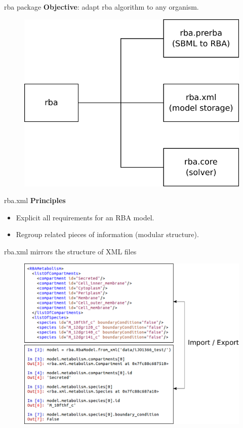 \documentclass{beamer}
\begin{document}
\begin{frame}{rba package}
  \textbf{Objective}: adapt rba algorithm to any organism.
  \begin{figure}[!ht]
    \centering
    \includegraphics[width=0.8\linewidth]{package_structure}
  \end{figure}
\end{frame}

\begin{frame}{rba.xml}
  \textbf{Principles}
  \begin{itemize}
    \item Explicit all requirements for an RBA model.
    \item Regroup related pieces of information (modular structure).
  \end{itemize}
\end{frame}

\begin{frame}[fragile]{rba.xml mirrors the structure of XML files}
  \begin{figure}[!ht]
    \centering
    \includegraphics[width=\linewidth]{xml_python_mirror}
  \end{figure}
\end{frame}
\end{document}
